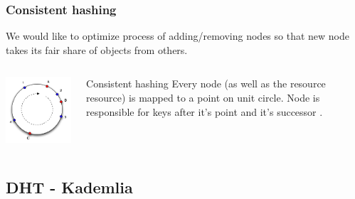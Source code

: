 \documentclass{beamer}
\begin{document}
\begin{frame}
\frametitle{Consistent hashing}

\begin{block}{}
We would like to optimize process of adding/removing nodes so that new node
takes its fair share of objects from others.
\end{block}

\begin{columns}[c]

\begin{center}
\includegraphics[width=0.75\linewidth]{consistent_hashing_1.png}
\end{center}

\begin{block}{Consistent hashing}
Every node (as well as the resource resource) is mapped to a point on unit circle.
Node is responsible for keys after it's point and it's successor \cite{karger1999web}. 
\end{block}

\end{columns}

\end{frame}



\subsection{DHT - Kademlia}
\end{document}
